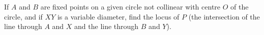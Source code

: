 If $A$ and $B$ are fixed points on a given circle not collinear with centre $O$ of the circle, and if $XY$ is a variable diameter, find the locus of $P$ (the intersection of the line through $A$ and $X$ and the line through $B$ and $Y$).